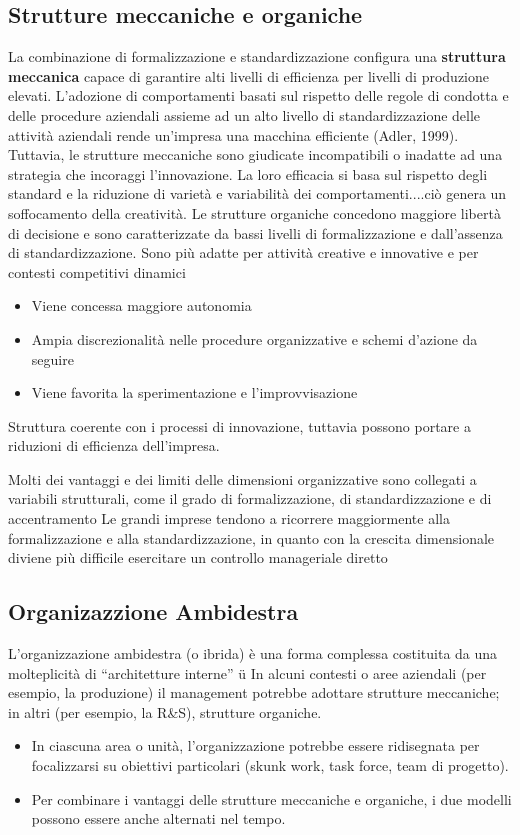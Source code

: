 \documentclass{article}
\begin{document}
\subsection{Strutture meccaniche e organiche}
La combinazione di formalizzazione e standardizzazione configura una
\textbf{struttura meccanica} capace di garantire alti livelli di efficienza per livelli
di produzione elevati.
L’adozione di comportamenti basati sul rispetto delle regole di
condotta e delle procedure aziendali assieme ad un alto livello di
standardizzazione delle attività aziendali rende un’impresa una
macchina efficiente (Adler, 1999).
Tuttavia, le strutture meccaniche sono giudicate incompatibili o
inadatte ad una strategia che incoraggi l’innovazione.
La loro efficacia si basa sul rispetto degli standard e la riduzione
di varietà e variabilità dei comportamenti....ciò genera un
soffocamento della creatività.
Le strutture organiche concedono maggiore libertà di decisione e sono
caratterizzate da bassi livelli di formalizzazione e dall’assenza di
standardizzazione. Sono più adatte per attività creative e innovative e per
contesti competitivi dinamici
\begin{itemize}
	\item Viene concessa maggiore autonomia
	\item Ampia discrezionalità nelle procedure organizzative e schemi
	d’azione da seguire
	\item  Viene favorita la sperimentazione e l’improvvisazione

\end{itemize}
Struttura coerente con i processi di innovazione, tuttavia possono portare
a riduzioni di efficienza dell’impresa.

Molti dei vantaggi e dei limiti delle dimensioni organizzative sono
collegati a variabili strutturali, come il grado di formalizzazione, di
standardizzazione e di accentramento
Le grandi imprese tendono a ricorrere
maggiormente alla formalizzazione e alla
standardizzazione, in quanto con la crescita
dimensionale diviene più difficile esercitare un
controllo manageriale diretto


\subsection{Organizazzione Ambidestra}
L’organizzazione ambidestra (o ibrida) è una forma complessa
costituita da una molteplicità di “architetture interne”
ü In alcuni contesti o aree aziendali (per esempio, la produzione) il
management potrebbe adottare strutture meccaniche; in altri (per
esempio, la R\&S), strutture organiche.
\begin{itemize}
\item In ciascuna area o unità, l’organizzazione potrebbe essere
ridisegnata per focalizzarsi su obiettivi particolari (skunk work,
task force, team di progetto).
\item Per combinare i vantaggi delle strutture meccaniche e organiche, i
due modelli possono essere anche alternati nel tempo.
\end{itemize}
\end{document}

